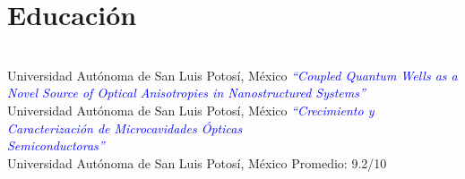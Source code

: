 \documentclass[letterpaper]{twentysecondcv} %
\begin{document}

\aboutme{} %







\makeprofile %



\section{Educaci\'on}

\begin{twenty} %
	                       {\\Universidad Aut\'onoma de San Luis Potos\'i, M\'exico}
	                       {\textcolor{blue}{\emph{``Coupled Quantum Wells as a Novel Source of Optical Anisotropies in Nanostructured Systems''}}}
	                      {\\Universidad Aut\'onoma de San Luis Potos\'i, M\'exico}
	                      {\textcolor{blue}{\emph{``Crecimiento y Caracterizaci\'on de Microcavidades \'Opticas \\ Semiconductoras''}}}
	                      {\\Universidad Aut\'onoma de San Luis Potos\'i, M\'exico}
	                      {Promedio: 9.2/10}
	
\end{twenty}
\end{document}
